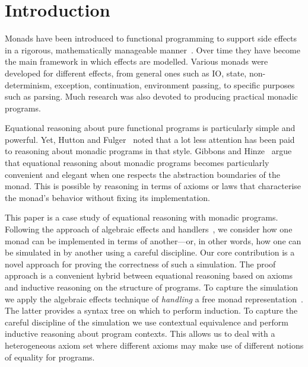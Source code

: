 \documentclass{jfp}
\begin{document}
\maketitle



\section{Introduction}
Monads have been introduced to functional programming to support side effects
in a rigorous, mathematically manageable
manner~\cite{Moggi:89:Computational,Wadler:92:Monads}. Over time they have
become the main framework in which effects are modelled. Various monads were
developed for different effects, from general ones such as IO, state,
non-determinism, exception, continuation, environment passing, to specific
purposes such as parsing. Much research was also devoted to producing practical
monadic programs.

Equational reasoning about pure functional programs is particularly simple and
powerful. Yet, Hutton and Fulger~\cite{HuttonFulger:08:Reasoning} noted that a
lot less attention has been paid to reasoning about monadic programs in that
style. Gibbons and Hinze~\cite{GibbonsHinze:11:Just} argue that equational
reasoning about monadic programs becomes particularly convenient and elegant
when one respects the abstraction boundaries of the monad. This is possible
by reasoning in terms of axioms or laws that characterise the monad's
behavior without fixing its implementation.

This paper is a case study of equational reasoning with monadic programs.
Following the approach of algebraic effects and
handlers~\cite{Plotkin:09:Handlers}, we consider how one monad can be
implemented in terms of another---or, in other words, how one can be simulated
in by another using a careful discipline. Our core contribution is a novel
approach for proving the correctness of such a simulation. The proof approach is
a convenient hybrid between equational reasoning based on axioms and inductive
reasoning on the structure of programs. To capture the simulation we apply the
algebraic effects technique of \emph{handling} a free monad
representation~\cite{Wu:14:Effect}.
The latter provides a syntax tree on which to perform
induction. To capture the careful discipline of the simulation we use contextual
equivalence and perform inductive reasoning about program contexts. This allows
us to deal with a heterogeneous axiom set where different axioms may make use of
different notions of equality for programs.
\end{document}
